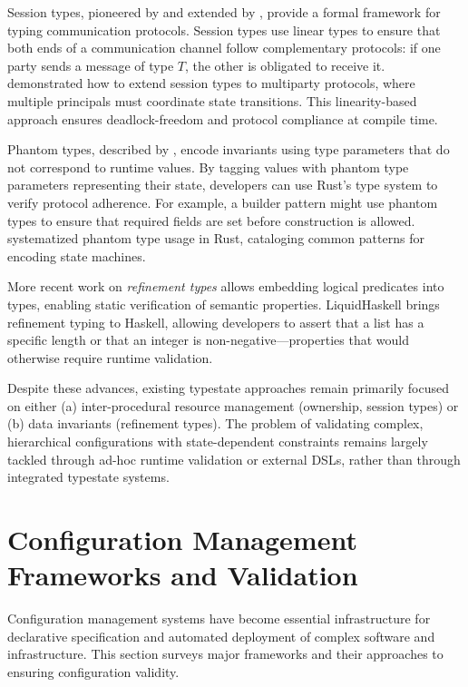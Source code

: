 Session types, pioneered by \citet{Honda1998} and extended by \citet{Gay2010}, provide a formal framework for typing communication protocols. Session types use linear types to ensure that both ends of a communication channel follow complementary protocols: if one party sends a message of type $T$, the other is obligated to receive it. \citet{Toninho2013} demonstrated how to extend session types to multiparty protocols, where multiple principals must coordinate state transitions. This linearity-based approach ensures deadlock-freedom and protocol compliance at compile time.

Phantom types, described by \citet{Leijen2002}, encode invariants using type parameters that do not correspond to runtime values. By tagging values with phantom type parameters representing their state, developers can use Rust's type system to verify protocol adherence. For example, a builder pattern might use phantom types to ensure that required fields are set before construction is allowed. \citet{Ruiz2018} systematized phantom type usage in Rust, cataloging common patterns for encoding state machines.

More recent work on \emph{refinement types} \citep{Rondon2008, Kawaguchi2009} allows embedding logical predicates into types, enabling static verification of semantic properties. LiquidHaskell \citep{Vazou2014} brings refinement typing to Haskell, allowing developers to assert that a list has a specific length or that an integer is non-negative—properties that would otherwise require runtime validation.

Despite these advances, existing typestate approaches remain primarily focused on either (a) inter-procedural resource management (ownership, session types) or (b) data invariants (refinement types). The problem of validating complex, hierarchical configurations with state-dependent constraints remains largely tackled through ad-hoc runtime validation or external DSLs, rather than through integrated typestate systems.

\section{Configuration Management Frameworks and Validation}

Configuration management systems have become essential infrastructure for declarative specification and automated deployment of complex software and infrastructure. This section surveys major frameworks and their approaches to ensuring configuration validity.

